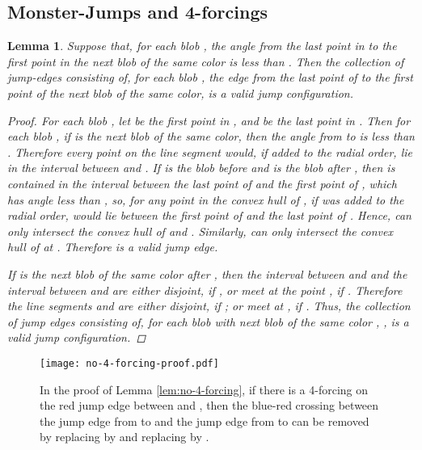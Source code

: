 \documentclass[12pt]{article}
\newtheorem{lemma}{Lemma}
\theoremstyle{definition}
\begin{document}
\subsection{Monster-Jumps and 4-forcings}
\begin{lemma}
  \label{lem:jump-config-exists}
  Suppose that, for each blob , the angle from the last point in  to the first point in the next blob of the same color is less than . Then the collection of jump-edges consisting of, for each blob , the edge from the last point of  to the first point of the next blob of the same color, is a valid jump configuration.
  \begin{proof}
    For each blob , let  be the first point in , and  be the last point in .
    Then for each blob , if  is the next blob of the same color, then the angle from  to  is less than .
    Therefore every point on the line segment  would, if added to the radial order, lie in the interval between  and .
    If  is the blob before  and  is the blob after , then  is contained in the interval between the last point of  and the first point of , which has angle less than , so, for any point  in the convex hull of , if  was added to the radial order,  would lie between the first point of  and the last point of .
    Hence,  can only intersect the convex hull of  and .
    Similarly,  can only intersect the convex hull of  at .
    Therefore  is a valid jump edge.

    If  is the next blob of the same color after , then the interval between  and  and the interval between  and  are either disjoint, if , or meet at the point , if .
    Therefore the line segments  and  are either disjoint, if ; or meet at , if .
    Thus, the collection  of jump edges consisting of, for each blob  with next blob of the same color , , is a valid jump configuration.
  \end{proof}
\end{lemma}

\begin{figure}
\centering
\texttt{[image: no-4-forcing-proof.pdf]}
\caption{In the proof of Lemma \ref{lem:no-4-forcing}, if there is a 4-forcing on the red jump edge between  and , then the blue-red crossing between the jump edge from  to  and the jump edge from  to  can be removed by replacing  by  and replacing  by .}
\label{fig:no-4-forcing-proof}
\end{figure}
\end{document}
